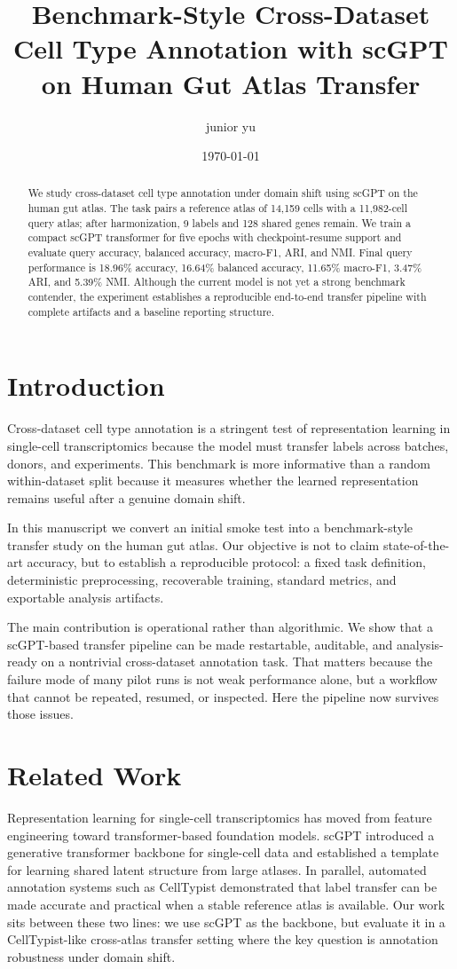 \documentclass[11pt]{article}
\title{Benchmark-Style Cross-Dataset Cell Type Annotation with scGPT on Human Gut Atlas Transfer}
\author{junior yu}
\date{\today}
\begin{document}
\maketitle

\begin{abstract}
We study cross-dataset cell type annotation under domain shift using scGPT on the human gut atlas.
The task pairs a reference atlas of 14{,}159 cells with a 11{,}982-cell query atlas; after harmonization, 9 labels and 128 shared genes remain.
We train a compact scGPT transformer for five epochs with checkpoint-resume support and evaluate query accuracy, balanced accuracy, macro-F1, ARI, and NMI.
Final query performance is 18.96\% accuracy, 16.64\% balanced accuracy, 11.65\% macro-F1, 3.47\% ARI, and 5.39\% NMI.
Although the current model is not yet a strong benchmark contender, the experiment establishes a reproducible end-to-end transfer pipeline with complete artifacts and a baseline reporting structure.
\end{abstract}

\section{Introduction}
Cross-dataset cell type annotation is a stringent test of representation learning in single-cell transcriptomics because the model must transfer labels across batches, donors, and experiments.
This benchmark is more informative than a random within-dataset split because it measures whether the learned representation remains useful after a genuine domain shift.

In this manuscript we convert an initial smoke test into a benchmark-style transfer study on the human gut atlas.
Our objective is not to claim state-of-the-art accuracy, but to establish a reproducible protocol: a fixed task definition, deterministic preprocessing, recoverable training, standard metrics, and exportable analysis artifacts.

The main contribution is operational rather than algorithmic.
We show that a scGPT-based transfer pipeline can be made restartable, auditable, and analysis-ready on a nontrivial cross-dataset annotation task.
That matters because the failure mode of many pilot runs is not weak performance alone, but a workflow that cannot be repeated, resumed, or inspected.
Here the pipeline now survives those issues.

\section{Related Work}
Representation learning for single-cell transcriptomics has moved from feature engineering toward transformer-based foundation models.
scGPT introduced a generative transformer backbone for single-cell data and established a template for learning shared latent structure from large atlases.
In parallel, automated annotation systems such as CellTypist demonstrated that label transfer can be made accurate and practical when a stable reference atlas is available.
Our work sits between these two lines: we use scGPT as the backbone, but evaluate it in a CellTypist-like cross-atlas transfer setting where the key question is annotation robustness under domain shift.
\end{document}
